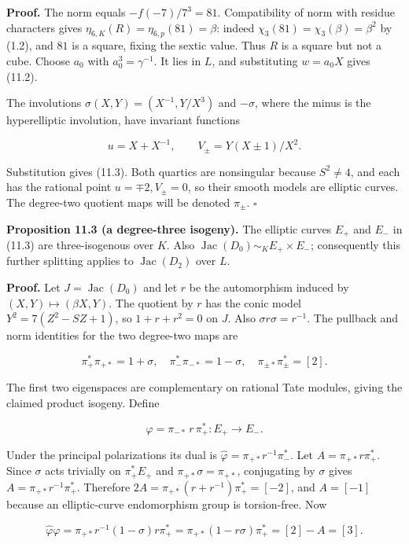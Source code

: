 \documentclass[
  11pt,
  a4paper,
]{article}
\begin{document}
\textbf{Proof.} The norm equals \(-f(-7)/7^3=81\). Compatibility of norm
with residue characters gives \(\eta_{6,K}(R)=\eta_{6,p}(81)=\beta\):
indeed \(\chi_3(81)=\chi_3(\beta)=\beta^2\) by (1.2), and \(81\) is a
square, fixing the sextic value. Thus \(R\) is a square but not a cube.
Choose \(a_0\) with \(a_0^3=\gamma^{-1}\). It lies in \(L\), and
substituting \(w=a_0X\) gives (11.2).

The involutions \(\sigma(X,Y)=(X^{-1},Y/X^3)\) and \(-\sigma\), where
the minus is the hyperelliptic involution, have invariant functions

\[
u=X+X^{-1},\qquad V_\pm=Y(X\pm1)/X^2.
\]

Substitution gives (11.3). Both quartics are nonsingular because
\(S^2\neq4\), and each has the rational point \(u=\mp2,V_\pm=0\), so
their smooth models are elliptic curves. The degree-two quotient maps
will be denoted \(\pi_\pm\). \(\square\)

\textbf{Proposition 11.3 (a degree-three isogeny).} The elliptic curves
\(E_+\) and \(E_-\) in (11.3) are three-isogenous over \(K\). Also
\(\operatorname{Jac}(D_0)\sim_K E_+\times E_-\); consequently this
further splitting applies to \(\operatorname{Jac}(D_2)\) over \(L\).

\textbf{Proof.} Let \(J=\operatorname{Jac}(D_0)\) and let \(r\) be the
automorphism induced by \((X,Y)\mapsto(\beta X,Y)\). The quotient by
\(r\) has the conic model \(Y^2=7(Z^2-SZ+1)\), so \(1+r+r^2=0\) on
\(J\). Also \(\sigma r\sigma=r^{-1}\). The pullback and norm identities
for the two degree-two maps are

\[
\pi_+^*\pi_{+*}=1+\sigma,\quad
\pi_-^*\pi_{-*}=1-\sigma,\quad
\pi_{\pm*}\pi_\pm^*=[2].
\]

The first two eigenspaces are complementary on rational Tate modules,
giving the claimed product isogeny. Define

\[
\varphi=\pi_{-*}\,r\,\pi_+^*:E_+\longrightarrow E_-.
\]

Under the principal polarizations its dual is
\(\widehat\varphi=\pi_{+*}r^{-1}\pi_-^*\). Let \(A=\pi_{+*}r\pi_+^*\).
Since \(\sigma\) acts trivially on \(\pi_+^*E_+\) and
\(\pi_{+*}\sigma=\pi_{+*}\), conjugating by \(\sigma\) gives
\(A=\pi_{+*}r^{-1}\pi_+^*\). Therefore
\(2A=\pi_{+*}(r+r^{-1})\pi_+^*=[-2]\), and \(A=[-1]\) because an
elliptic-curve endomorphism group is torsion-free. Now

\[
\widehat\varphi\varphi
=\pi_{+*}r^{-1}(1-\sigma)r\pi_+^*
=\pi_{+*}(1-r\sigma)\pi_+^*
=[2]-A=[3].
\]
\end{document}
